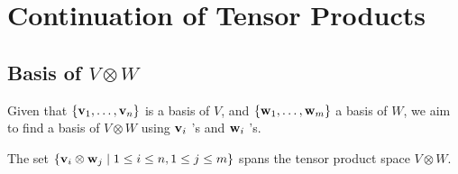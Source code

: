 \chapter{Continuation of Tensor Products}

\section{Basis of \(V \otimes W\)}

Given that \(\left\{  {{\bf v}_1,\ldots ,{\bf v}_n}\right\}\) is a basis of \(V\), and \(\left\{  {{\bf w}_1,\ldots ,{\bf w}_{m}}\right\}\) a basis of \(W\), we aim to find a basis of \(V \otimes  W\) using \({\bf v}_{i}\) ’s and \({\bf w}_{i}\) ’s.

\begin{proposition}\label{prop: tensor-span}
    The set \(\left\{  {{\bf v}_{i} \otimes  {\bf w}_{j} \mid  1 \leq  i \leq  n,1 \leq  j \leq  m}\right\}\) spans the tensor product space \(V \otimes  W\).
\end{proposition}

